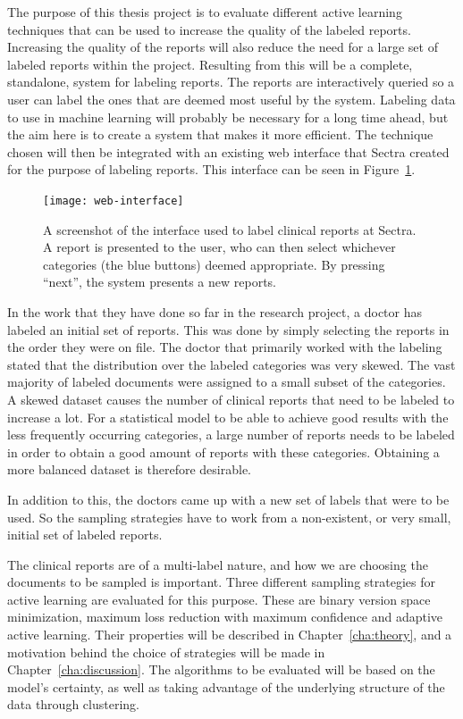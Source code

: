 The purpose of this thesis project is to evaluate different active learning techniques that can be used to increase the quality of the labeled reports.
Increasing the quality of the reports will also reduce the need for a large set of labeled reports within the project.
Resulting from this will be a complete, standalone, system for labeling reports.
The reports are interactively queried so a user can label the ones that are deemed most useful by the system.
Labeling data to use in machine learning will probably be necessary for a long time ahead, but the aim here is to create a system that makes it more efficient.
The technique chosen will then be integrated with an existing web interface that Sectra created for the purpose of labeling reports.
This interface can be seen in Figure~\ref{fig:web-interface}.

\begin{figure}
      \centering
      \texttt{[image: web-interface]}
      \caption{A screenshot of the interface used to label clinical reports at Sectra. 
               A report is presented to the user, who can then select whichever categories (the blue buttons) deemed appropriate.
               By pressing ``next'', the system presents a new reports.}
      \label{fig:web-interface}
\end{figure}

In the work that they have done so far in the research project, a doctor has labeled an initial set of reports.
This was done by simply selecting the reports in the order they were on file.
The doctor that primarily worked with the labeling stated that the distribution over the labeled categories was very skewed.
The vast majority of labeled documents were assigned to a small subset of the categories.
A skewed dataset causes the number of clinical reports that need to be labeled to increase a lot.
For a statistical model to be able to achieve good results with the less frequently occurring categories, a large number of reports needs to be labeled in order to obtain a good amount of reports with these categories.
Obtaining a more balanced dataset is therefore desirable.

In addition to this, the doctors came up with a new set of labels that were to be used.
So the sampling strategies have to work from a non-existent, or very small, initial set of labeled reports.

The clinical reports are of a multi-label nature, and how we are choosing the documents to be sampled is important.
Three different sampling strategies for active learning are evaluated for this purpose.
These are binary version space minimization, maximum loss reduction with maximum confidence and adaptive active learning.
Their properties will be described in Chapter~\ref{cha:theory}, and a motivation behind the choice of strategies will be made in Chapter~\ref{cha:discussion}.
The algorithms to be evaluated will be based on the model's certainty, as well as taking advantage of the underlying structure of the data through clustering.

